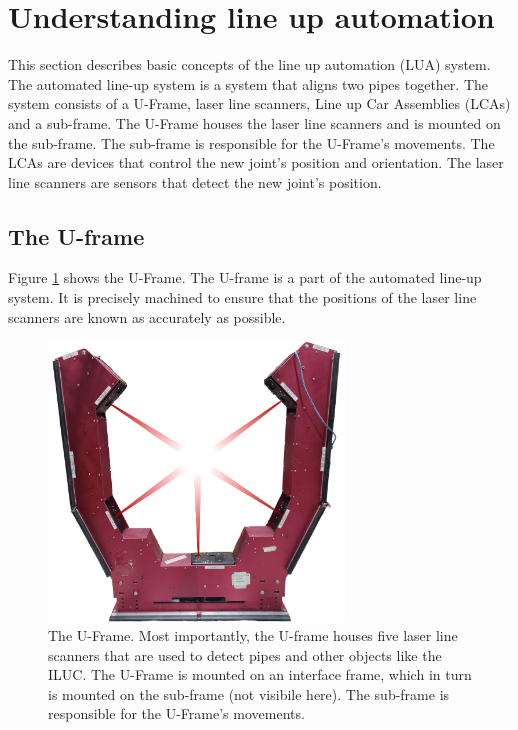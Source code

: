 \section{Understanding line up automation} \label{sec:understanding_automated_line_up}
This section describes basic concepts of the line up automation (LUA) system. The automated line-up system is a system that aligns two pipes together. The system consists of a U-Frame, laser line scanners, Line up Car Assemblies (LCAs) and a sub-frame. The U-Frame houses the laser line scanners and is mounted on the sub-frame. The sub-frame is responsible for the U-Frame's movements. The LCAs are devices that control the new joint's position and orientation. The laser line scanners are sensors that detect the new joint's position.

\subsection{The U-frame} \label{ssec:U-frame}
Figure \ref{fig:U-frame} shows the U-Frame. The U-frame is a part of the automated line-up system. It is precisely machined to ensure that the positions of the laser line scanners are known as accurately as possible.
\begin{figure}[H]
    \centering
    \includegraphics[width=0.7\textwidth]{images/u_frame_lasers.png}
    \caption{The U-Frame. Most importantly, the U-frame houses five laser line scanners that are used to detect pipes and other objects like the ILUC. The U-Frame is mounted on an interface frame, which in turn is mounted on the sub-frame (not visibile here). The sub-frame is responsible for the U-Frame's movements.}
    \label{fig:U-frame}
\end{figure}


